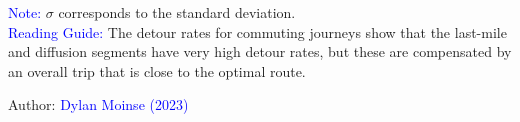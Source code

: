     \begin{table}[h!]
    \centering
    \renewcommand{\arraystretch}{1.5}
    \caption{Detour rates for commuting journeys involving a detour.}
    \label{table-chap5:taux-detours}
        \vspace{5pt}
        \begin{flushleft}\scriptsize{
        \textcolor{blue}{Note:} $\sigma$ corresponds to the standard deviation.
        \\
        \textcolor{blue}{Reading Guide:} The detour rates for commuting journeys show that the last-mile and diffusion segments have very high detour rates, but these are compensated by an overall trip that is close to the optimal route.
        }\end{flushleft}
        \begin{flushright}\scriptsize{
        Author: \textcolor{blue}{Dylan Moinse (2023)}
        }\end{flushright}
        \end{table}
